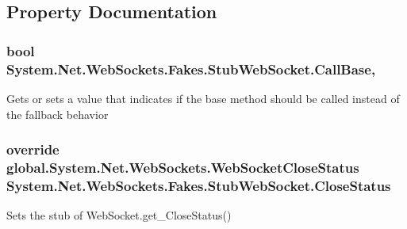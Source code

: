 \subsection{Property Documentation}
\hypertarget{class_system_1_1_net_1_1_web_sockets_1_1_fakes_1_1_stub_web_socket_ac732b40ae48b3713f2c28165f8ae10c4}{
\subsubsection[{Call\-Base}]{\setlength{\rightskip}{0pt plus 5cm}bool System.\-Net.\-Web\-Sockets.\-Fakes.\-Stub\-Web\-Socket.\-Call\-Base\hspace{0.3cm}{\ttfamily [get]}, {\ttfamily [set]}}}\label{class_system_1_1_net_1_1_web_sockets_1_1_fakes_1_1_stub_web_socket_ac732b40ae48b3713f2c28165f8ae10c4}


Gets or sets a value that indicates if the base method should be called instead of the fallback behavior

\hypertarget{class_system_1_1_net_1_1_web_sockets_1_1_fakes_1_1_stub_web_socket_a9bc11940cf54a3c6cc0805a300d4a9a0}{
\subsubsection[{Close\-Status}]{\setlength{\rightskip}{0pt plus 5cm}override global.\-System.\-Net.\-Web\-Sockets.\-Web\-Socket\-Close\-Status System.\-Net.\-Web\-Sockets.\-Fakes.\-Stub\-Web\-Socket.\-Close\-Status\hspace{0.3cm}{\ttfamily [get]}}}\label{class_system_1_1_net_1_1_web_sockets_1_1_fakes_1_1_stub_web_socket_a9bc11940cf54a3c6cc0805a300d4a9a0}


Sets the stub of Web\-Socket.\-get\-\_\-\-Close\-Status()

